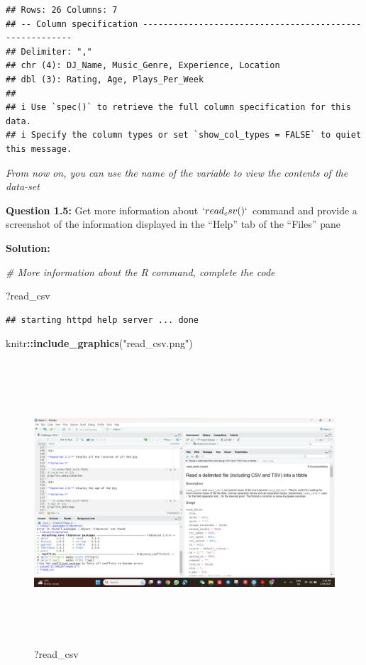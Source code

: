 \documentclass[
]{article}
\newenvironment{Shaded}{\begin{snugshade}}{\end{snugshade}}
\newcommand{\CommentTok}[1]{\textcolor[rgb]{0.56,0.35,0.01}{\textit{#1}}}
\newcommand{\FunctionTok}[1]{\textcolor[rgb]{0.13,0.29,0.53}{\textbf{#1}}}
\newcommand{\NormalTok}[1]{#1}
\newcommand{\SpecialCharTok}[1]{\textcolor[rgb]{0.81,0.36,0.00}{\textbf{#1}}}
\newcommand{\StringTok}[1]{\textcolor[rgb]{0.31,0.60,0.02}{#1}}
\begin{document}
\begin{verbatim}
## Rows: 26 Columns: 7
## -- Column specification --------------------------------------------------------
## Delimiter: ","
## chr (4): DJ_Name, Music_Genre, Experience, Location
## dbl (3): Rating, Age, Plays_Per_Week
## 
## i Use `spec()` to retrieve the full column specification for this data.
## i Specify the column types or set `show_col_types = FALSE` to quiet this message.
\end{verbatim}

\emph{From now on, you can use the name of the variable to view the
contents of the data-set}

\textbf{Question 1.5:} Get more information about \(`read_csv()`\)
command and provide a screenshot of the information displayed in the
``Help'' tab of the ``Files'' pane

\textbf{Solution:}

\begin{Shaded}
\begin{Highlighting}[]
\CommentTok{\# More information about the R command, complete the code}

\NormalTok{?read\_csv}
\end{Highlighting}
\end{Shaded}

\begin{verbatim}
## starting httpd help server ... done
\end{verbatim}

\begin{Shaded}
\begin{Highlighting}[]
\NormalTok{knitr}\SpecialCharTok{::}\FunctionTok{include\_graphics}\NormalTok{(}\StringTok{"read\_csv.png"}\NormalTok{)}
\end{Highlighting}
\end{Shaded}

\begin{figure}
\includegraphics[width=800px,height=400px]{read_csv} \caption{?read_csv}\label{fig:unnamed-chunk-5}
\end{figure}
\end{document}

